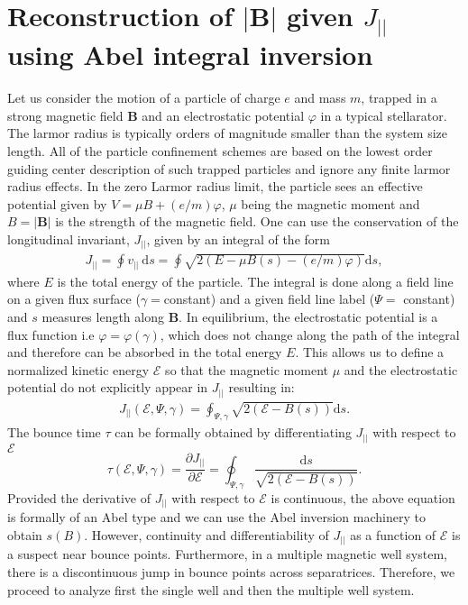 \documentclass[aip,pop,reprint]{revtex4-1}
\newcommand*{\cE}{\mathcal{E}}
\newcommand*{\B}{\bm{B}}
\newcommand*{\vpl}{v_{||}}
\newcommand*{\Jpl}{J_{||}}
\newcommand*{\dt}{\mathrm{d}}
\begin{document}
\section{Reconstruction of $|\B|$ given $\Jpl$ using Abel integral inversion}
\label{sec:abelJpl}
Let us consider the motion of a particle of charge $e$ and mass $m$, trapped in a strong magnetic field $\B$ and an electrostatic potential $\varphi$ in a typical stellarator. The larmor radius is typically orders of magnitude smaller than the system size length. All of the particle confinement schemes are based on the lowest order guiding center description of such trapped particles and ignore any finite larmor radius effects. In the zero Larmor radius limit, the particle sees an effective potential given by $V= \mu B+(e/m)\varphi$, $\mu$ being the magnetic moment and $B=|\B|$ is the strength of the magnetic field. One can use the conservation \cite{helander2014theory} of the longitudinal invariant, $\Jpl$, given by an integral of the form 
\begin{align*}
\Jpl= \oint \vpl \:\dt s = \oint \sqrt{2(E-\mu B(s)-(e/m)\varphi)}\dt s,
\end{align*}
where $E$ is the total energy of the particle. The integral is done along a field line on a given flux surface ($\gamma =$constant) and a given field line label ($\Psi=$ constant) and $s$ measures length along $\B$. In equilibrium, the electrostatic potential is a flux function i.e $\varphi=\varphi(\gamma)$, which does not change along the path of the integral and therefore can be absorbed in the total energy $E$. This allows us to define a normalized kinetic energy $\cE$ so that the magnetic moment $\mu$ and the electrostatic potential do not explicitly appear in $\Jpl$ resulting in:
\begin{align}
\Jpl(\cE,\Psi,\gamma)= \oint_{\Psi,\gamma}\sqrt{2(\cE-B(s))}\dt s . \label{Jpl}
\end{align}
The bounce time $\tau$ can be formally obtained by differentiating $\Jpl$ with respect to $\cE$
\begin{equation}
\tau(\cE,\Psi,\gamma)=\frac{\partial \Jpl}{\partial \cE} =\oint_{\Psi,\gamma} \frac{\dt s}{\sqrt{2(\cE-B(s))}}.
\label{tauE}
\end{equation}
Provided the derivative of $\Jpl$ with respect to $\cE$ is continuous, the above equation is formally of an Abel type and we can use the Abel inversion machinery to obtain $s(B)$. However, continuity and differentiability of $\Jpl$ as a function of $\cE$ is a suspect near bounce points. Furthermore, in a multiple magnetic well system, there is a discontinuous jump in bounce points across separatrices. Therefore, we proceed to analyze first the single well and then the multiple well system.
 
\end{document}
